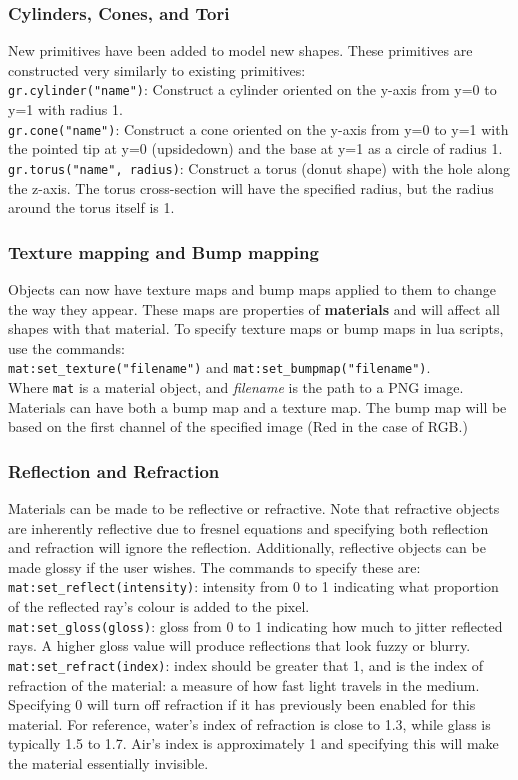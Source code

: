 \documentclass {article}
\begin{document}
\subsubsection{Cylinders, Cones, and Tori}
New primitives have been added to model new shapes.  These primitives are
constructed very similarly to existing primitives:\\
\verb!gr.cylinder("name")!: Construct a cylinder oriented on the y-axis from
y=0 to y=1 with radius 1.\\
\verb!gr.cone("name")!: Construct a cone oriented on the y-axis from
y=0 to y=1 with the pointed tip at y=0 (upsidedown) and the base at y=1 as a
circle of radius 1.\\
\verb!gr.torus("name", radius)!: Construct a torus (donut shape) with the
hole along the z-axis.  The torus cross-section will have the specified radius,
but the radius around the torus itself is 1.

\subsubsection{Texture mapping and Bump mapping}
Objects can now have texture maps and bump maps applied to them to change the
way they appear.  These maps are properties of \textbf{materials} and will
affect all shapes with that material.  To specify texture maps or bump maps in
lua scripts, use the commands:\\
\verb!mat:set_texture("filename")! and \verb!mat:set_bumpmap("filename")!.\\
Where \verb!mat! is a material object, and \textit{filename} is the path to a
PNG image.  Materials can have both a bump map and a texture map.  The bump map
will be based on the first channel of the specified image (Red in the case of
RGB.)

\subsubsection{Reflection and Refraction}
Materials can be made to be reflective or refractive.  Note that refractive
objects are inherently reflective due to fresnel equations and specifying both
reflection and refraction will ignore the reflection.  Additionally, reflective
objects can be made glossy if the user wishes.  The commands to specify these
are:\\
\verb!mat:set_reflect(intensity)!: intensity from 0 to 1 indicating what
proportion of the reflected ray's colour is added to the pixel.\\
\verb!mat:set_gloss(gloss)!: gloss from 0 to 1 indicating how much to
jitter reflected rays.  A higher gloss value will produce reflections that look
fuzzy or blurry.\\
\verb!mat:set_refract(index)!: index should be greater that 1, and is the
index of refraction of the material: a measure of how fast light travels in the
medium.  Specifying 0 will turn off refraction if it has previously been enabled
for this material.  For reference, water's index of refraction is close to 1.3,
while glass is typically 1.5 to 1.7.  Air's index is approximately 1 and
specifying this will make the material essentially invisible.
\end{document}
